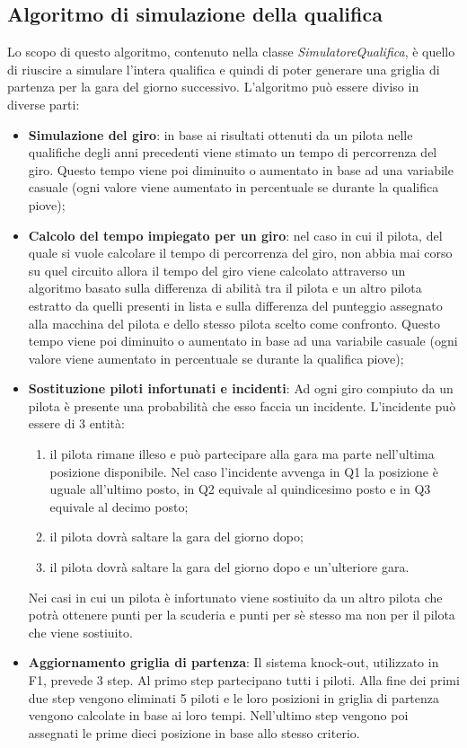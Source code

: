 \subsection{Algoritmo di simulazione della qualifica}
Lo scopo di questo algoritmo, contenuto nella classe \textit{SimulatoreQualifica}, è quello di riuscire a simulare l'intera qualifica e quindi di poter generare una griglia di partenza per la gara del giorno successivo. L'algoritmo può essere diviso in diverse parti:
\begin{itemize}

    \item \textbf{Simulazione del giro}: in base ai risultati ottenuti da un pilota nelle qualifiche degli anni precedenti viene stimato un tempo di percorrenza del giro. Questo tempo viene poi diminuito o aumentato in base ad una variabile casuale (ogni valore viene aumentato in percentuale se durante la qualifica piove);
    \item \textbf{Calcolo del tempo impiegato per un giro}: nel caso in cui il pilota, del quale si vuole calcolare il tempo di percorrenza del giro, non abbia mai corso su quel circuito allora il tempo del giro viene calcolato attraverso un algoritmo basato sulla differenza di abilità tra il pilota e un altro pilota estratto da quelli presenti in lista e sulla differenza del punteggio assegnato alla macchina del pilota e dello stesso pilota scelto come confronto. Questo tempo viene poi diminuito o aumentato in base ad una variabile casuale (ogni valore viene aumentato in percentuale se durante la qualifica piove);
    \item \textbf{Sostituzione piloti infortunati e incidenti}: Ad ogni giro compiuto da un pilota è presente una probabilità che esso faccia un incidente. L'incidente può essere di 3 entità: 
    \begin{enumerate}
    \item il pilota rimane illeso e può partecipare alla gara ma parte nell'ultima posizione disponibile. Nel caso l'incidente avvenga in Q1 la posizione è uguale all'ultimo posto, in Q2 equivale al quindicesimo posto e in Q3 equivale al decimo posto;
    \item il pilota dovrà saltare la gara del giorno dopo;
    \item il pilota dovrà saltare la gara del giorno dopo e un'ulteriore gara.
    \end{enumerate}
    Nei casi in cui un pilota è infortunato viene sostiuito da un altro pilota che potrà ottenere punti per la scuderia e punti per sè stesso ma non per il pilota che viene sostiuito.
    \item \textbf{Aggiornamento griglia di partenza}: Il sistema knock-out, utilizzato in F1, prevede 3 step. Al primo step partecipano tutti i piloti. Alla fine dei primi due step vengono eliminati 5 piloti e le loro posizioni in griglia di partenza vengono calcolate in base ai loro tempi. Nell'ultimo step vengono poi assegnati le prime dieci posizione in base allo stesso criterio.
\end{itemize}
